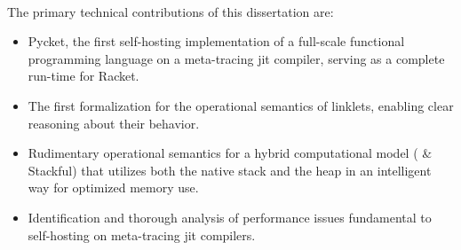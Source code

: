         \paragraph{}%
            The primary technical contributions of this dissertation are:
            \begin{itemize}
                \item Pycket, the first self-hosting implementation of a full-scale functional programming language on a meta-tracing \gls{jit} compiler, serving as a complete run-time for Racket. %
                \item The first formalization for the operational semantics of linklets, enabling clear reasoning about their behavior. %
                \item Rudimentary operational semantics for a hybrid computational model ( \& Stackful) that utilizes both the native stack and the heap in an intelligent way for optimized memory use. %
                \item Identification and thorough analysis of performance issues fundamental to self-hosting on meta-tracing \gls{jit} compilers. %
            \end{itemize}

